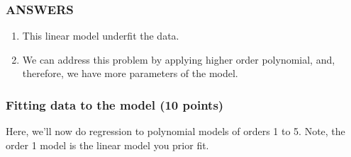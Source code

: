 \documentclass[11pt]{article}
\begin{document}
    \hypertarget{answers}{%
\subsubsection{ANSWERS}\label{answers}}

\begin{enumerate}
\def\labelenumi{(\arabic{enumi})}
\item
  This linear model underfit the data.
\item
  We can address this problem by applying higher order polynomial, and,
  therefore, we have more parameters of the model.
\end{enumerate}

    \hypertarget{fitting-data-to-the-model-10-points}{%
\subsubsection{Fitting data to the model (10
points)}\label{fitting-data-to-the-model-10-points}}

Here, we'll now do regression to polynomial models of orders 1 to 5.
Note, the order 1 model is the linear model you prior fit.
\end{document}
